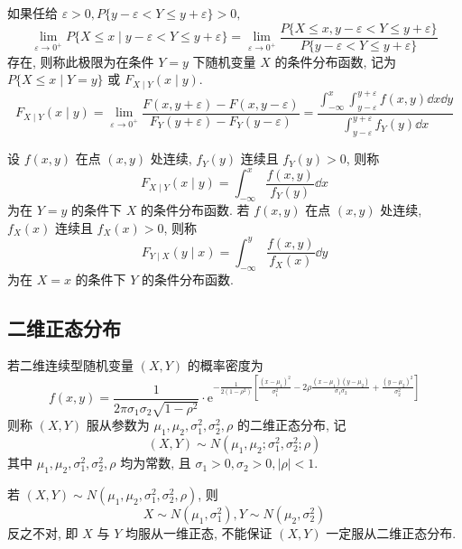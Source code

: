 \begin{definition}[二维随机变量条件分布函数 A]
    如果任给 $ \varepsilon>0, P\{y-\varepsilon<Y \leqslant y+\varepsilon\}>0 ,$
    $$\lim _{\varepsilon \rightarrow 0^{+}} P\{X \leqslant x \mid y-\varepsilon<Y \leqslant y+\varepsilon\}=\lim _{\varepsilon \rightarrow 0^{+}} \frac{P\{X \leqslant x, y-\varepsilon<Y \leqslant y+\varepsilon\}}{P\{y-\varepsilon<Y \leqslant y+\varepsilon\}}$$
    存在, 则称此极限为在条件 $ Y=y $ 下随机变量 $ X $ 的条件分布函数, 记为 $ P\{X \leqslant x \mid Y=y\} $ 或 $ F_{X \mid Y}(x \mid y) $.
    $$F_{X \mid Y}(x \mid y)=\lim _{\varepsilon \rightarrow 0^{+}} \frac{F(x, y+\varepsilon)-F(x, y-\varepsilon)}{F_{Y}(y+\varepsilon)-F_{Y}(y-\varepsilon)}
    =\frac{\displaystyle\int_{-\infty}^{x} \int_{y-\varepsilon}^{y+\varepsilon} f(x, y) \dd  x \dd  y}{\displaystyle \int_{y-\varepsilon}^{y+\varepsilon} f_{Y}(y) \dd  x}$$
\end{definition}

\begin{definition}[二维随机变量条件分布函数 B]
    设 $ f(x, y) $ 在点 $ (x, y) $ 处连续, $f_{Y}(y) $ 连续且 $ f_{Y}(y)>0 $, 则称
    $$F_{X \mid Y}(x \mid y)=\int_{-\infty}^{x} \frac{f(x, y)}{f_{Y}(y)} \dd  x$$
    为在 $ Y=y $ 的条件下 $ X $ 的条件分布函数.
    若 $ f(x, y) $ 在点 $ (x, y) $ 处连续, $f_{X}(x) $ 连续且 $ f_{X}(x)>0 $, 则称
    $$F_{Y \mid X}(y \mid x)=\int_{-\infty}^{y} \frac{f(x, y)}{f_{X}(x)} \dd  y$$
    为在 $ X=x $ 的条件下 $ Y $ 的条件分布函数.
\end{definition}

\subsection{二维正态分布}

\begin{definition}[二维正态分布]
    若二维连续型随机变量 $ (X, Y) $ 的概率密度为
    $$f(x,y)=\frac{1}{2 \pi \sigma_{1} \sigma_{2} \sqrt{1-\rho^{2}}} \cdot \mathrm{e}^{-\frac{1}{2\left(1-\rho^{2}\right)}\left[\frac{\left(x-\mu_{1}\right)^{2}}{\sigma_{1}^{2}}-2 \rho \frac{\left(x-\mu_{1}\right)\left(y-\mu_{2}\right)}{\sigma_{1} \sigma_{2}}+\frac{\left(y-\mu_{2}\right)^{2}}{\sigma_{2}^{2}}\right]}$$
    则称 $ (X, Y) $ 服从参数为 $ \mu_{1}, \mu_{2}, \sigma_{1}^{2}, \sigma_{2}^{2}, \rho $ 的二维正态分布, 
    记 $$ (X, Y) \sim N\left(\mu_{1}, \mu_{2}; \sigma_{1}^{2}, \sigma_{2}^{2}; \rho\right) $$
    其中 $ \mu_{1}, \mu_{2}, \sigma_{1}^{2}, \sigma_{2}^{2}, \rho $ 均为常数, 且 $ \sigma_{1}>0, \sigma_{2}>0,|\rho|<1 .$
\end{definition}
\begin{theorem}[二维正态分布推出一维正态分布]
    若 $ (X, Y) \sim N\left(\mu_{1}, \mu_{2}, \sigma_{1}^{2}, \sigma_{2}^{2}, \rho\right) $, 则
    $$X \sim N\left(\mu_{1}, \sigma_{1}^{2}\right), Y \sim N\left(\mu_{2}, \sigma_{2}^{2}\right)$$
    反之不对, 即 $ X $ 与 $ Y $ 均服从一维正态, 不能保证 $ (X, Y) $ 一定服从二维正态分布.
\end{theorem}

